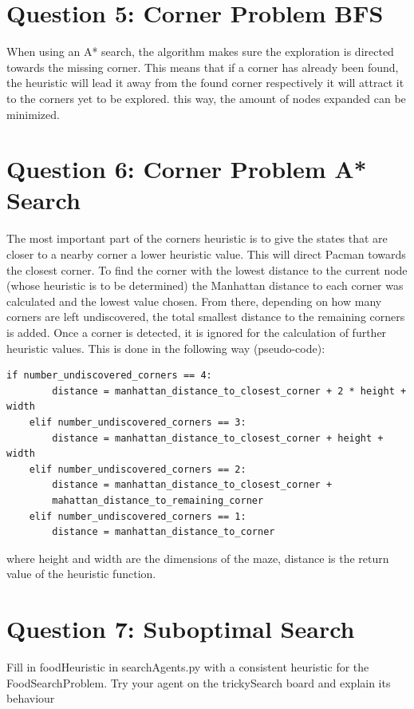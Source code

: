 \documentclass[onecolumn]{article}
\begin{document}
	\section{Question 5: Corner Problem BFS}
	When using an A* search, the algorithm makes sure the exploration is directed towards the missing corner. This means that if a corner has already been found, the heuristic will lead it away from the found corner respectively it will attract it to the corners yet to be explored. this way, the amount of nodes expanded can be minimized.
	
	\newpage
	\vspace*{80px}

	\section{Question 6: Corner Problem A* Search}	
	The most important part of the corners heuristic is to give the states that are closer to a nearby corner a lower heuristic value. This will direct Pacman towards the closest corner. To find the corner with the lowest distance to the current node (whose heuristic is to be determined) the Manhattan distance to each corner was calculated and the lowest value chosen. From there, depending on how many corners are left undiscovered, the total smallest distance to the remaining corners is added.
	Once a corner is detected, it is ignored for the calculation of further heuristic values. This is done in the following way (pseudo-code):
	
	\begin{lstlisting}[style=Python]
	if number_undiscovered_corners == 4:
		distance = manhattan_distance_to_closest_corner + 2 * height + width
	elif number_undiscovered_corners == 3:
		distance = manhattan_distance_to_closest_corner + height + width
	elif number_undiscovered_corners == 2:
		distance = manhattan_distance_to_closest_corner +
		mahattan_distance_to_remaining_corner
	elif number_undiscovered_corners == 1:
		distance = manhattan_distance_to_corner
	\end{lstlisting}
	
	where height and width are the dimensions of the maze, distance is the return value of the heuristic function.

	
	\section{Question 7: Suboptimal Search}
	Fill in foodHeuristic in searchAgents.py with a consistent heuristic for the FoodSearchProblem. Try your agent on the trickySearch board and explain its behaviour
\end{document}
